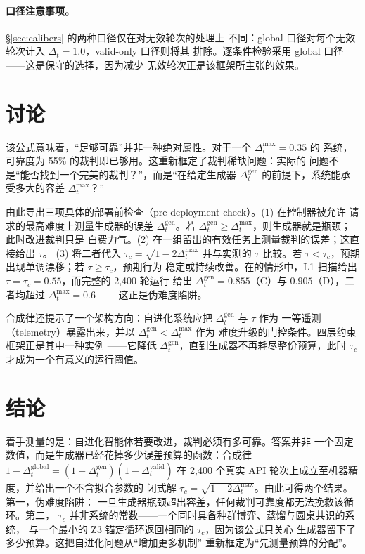 \paragraph{口径注意事项。} \S\ref{sec:calibers} 的两种口径仅在对无效轮次的处理上
不同：global 口径对每个无效轮次计入 $\Delta_t = 1.0$，valid-only 口径则将其
排除。逐条件检验采用 global 口径——这是保守的选择，因为减少
无效轮次正是该框架所主张的效果。

\section{讨论}

该公式意味着，“足够可靠”并非一种绝对属性。对于一个 $\Delta_t^{\max} = 0.35$ 的
系统，可靠度为 55\% 的裁判即已够用。这重新框定了裁判稀缺问题：实际的
问题不是“能否找到一个完美的裁判？”，而是“在给定生成器
$\Delta_t^{\mathrm{gen}}$ 的前提下，系统能承受多大的容差 $\Delta_t^{\max}$？”

由此导出三项具体的部署前检查（pre-deployment check）。(1) 在控制器被允许
请求的最高难度上测量生成器的误差 $\Delta_t^{\mathrm{gen}}$。若
$\Delta_t^{\mathrm{gen}} \ge \Delta_t^{\max}$，则生成器就是瓶颈；此时改进裁判只是
白费力气。(2) 在一组留出的有效任务上测量裁判的误差；这直接给出 $\tau$。
(3) 将二者代入 $\tau_c = \sqrt{1 - 2\Delta_t^{\max}}$ 并与实测的
$\tau$ 比较。若 $\tau < \tau_c$，预期出现单调漂移；若 $\tau \ge \tau_c$，预期行为
稳定或持续改善。在的情形中，L1 扫描给出 $\tau = \tau_c = 0.55$，而完整的 2,400 轮运行
给出 $\Delta_t^{\mathrm{gen}} = 0.855$（C）与 $0.905$（D），二者均超过 $\Delta_t^{\max} = 0.6$
——这正是伪难度陷阱。

合成律还提示了一个架构方向：自进化系统应把 $\Delta_t^{\mathrm{gen}}$ 与 $\tau$ 作为
一等遥测（telemetry）暴露出来，并以 $\Delta_t^{\mathrm{gen}} < \Delta_t^{\max}$ 作为
难度升级的门控条件。四层约束框架正是其中一种实例
——它降低 $\Delta_t^{\mathrm{gen}}$，直到生成器不再耗尽整份预算，此时
$\tau_c$ 才成为一个有意义的运行阈值。

\section{结论}

着手测量的是：自进化智能体若要改进，裁判必须有多可靠。答案并非
一个固定数值，而是生成器已经花掉多少误差预算的函数：合成律
$1 - \Delta_t^{\mathrm{global}} = (1 - \Delta_t^{\mathrm{gen}})(1 - \Delta_t^{\mathrm{valid}})$
在 2{,}400 个真实 API 轮次上成立至机器精度，并给出一个不含拟合参数的
闭式解 $\tau_c = \sqrt{1 - 2\Delta_t^{\max}}$。由此可得两个结果。第一，伪难度陷阱：
一旦生成器瓶颈超出容差，任何裁判可靠度都无法挽救该循环。第二，
$\tau_c$ 并非系统的常数——一个同时具备种群博弈、蒸馏与圆桌共识的系统，
与一个最小的 Z3 锚定循环返回相同的 $\tau_c$，因为该公式只关心
生成器留下了多少预算。这把自进化问题从“增加更多机制”
重新框定为“先测量预算的分配”。

